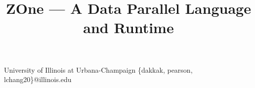\documentclass[nocopyrightspace]{sigplanconf}
\begin{document}

\title{ZOne --- A Data Parallel Language and Runtime}

           {University of Illinois at Urbana-Champaign}
           {\{dakkak, pearson, lchang20\}@illinois.edu}


\maketitle




















\end{document}
